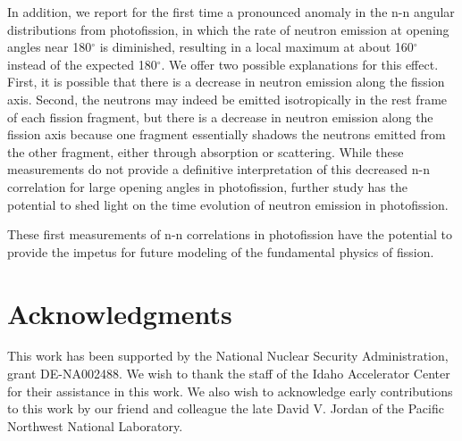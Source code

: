 \documentclass[%
 reprint,
 calc,
 amsmath,amssymb,
 aps,
 nofootinbib,
 linenumbers
]{revtex4-1}
\begin{document}
In addition, we report for the first time a pronounced anomaly in the n-n angular distributions from photofission, in which the rate of neutron emission at opening angles near 180$^{\circ}$ is diminished, resulting in a local maximum at about 160$^{\circ}$ instead of the expected 180$^{\circ}$.
We offer two possible explanations for this effect.
First, it is possible that there is a decrease in neutron emission along the fission axis.
Second, the neutrons may indeed be emitted isotropically in the rest frame of each fission fragment, but there is a decrease in neutron emission along the fission axis because one fragment essentially shadows the neutrons emitted from the other fragment, either through absorption or scattering.
While these measurements do not provide a definitive interpretation of this decreased n-n correlation for large opening angles in photofission, further study has the potential to shed light on the time evolution of neutron emission in photofission.

These first measurements of n-n correlations in photofission have the potential to provide the impetus for future modeling of the fundamental physics of fission.

\section{Acknowledgments}
This work has been supported by the National Nuclear Security Administration, grant DE-NA002488. We wish to thank the staff of the Idaho Accelerator Center for their assistance in this work. We also wish to acknowledge early contributions to this work by our friend and colleague the late David V. Jordan of the Pacific Northwest National Laboratory.

%

\end{document}
